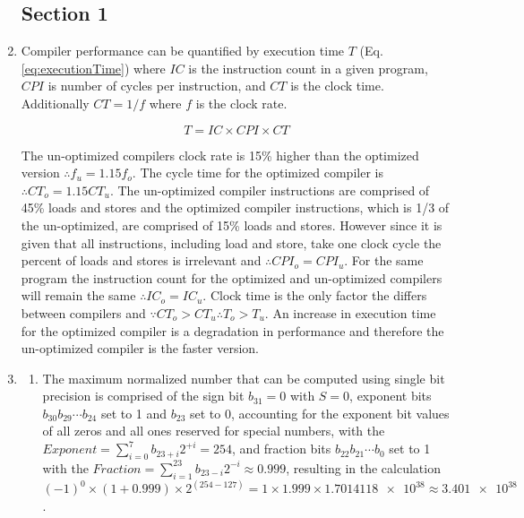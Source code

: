 \documentclass[main.tex]{subfiles}
\begin{document}
\begin{enumerate}

\subsection{Section 1}

\item Compiler performance can be quantified by execution time $T$ (Eq. \ref{eq:executionTime}) where $IC$ is the instruction count in a given program, $CPI$ is number of cycles per instruction, and $CT$ is the clock time. Additionally $CT=1/f$ where $f$ is the clock rate.

\begin{equation} \label{eq:executionTime}
T = IC \times CPI \times CT
\end{equation}

The un-optimized compilers clock rate is 15\% higher than the optimized version $\therefore f_{u} = 1.15f_{o}$. The cycle time for the optimized compiler is $\therefore CT_o = 1.15CT_u$. The un-optimized compiler instructions are comprised of 45\% loads and stores and the optimized compiler instructions, which is 1/3 of the un-optimized, are comprised of 15\% loads and stores. However since it is given that all instructions, including load and store, take one clock cycle the percent of loads and stores is irrelevant and $\therefore CPI_o = CPI_u$. For the same program the instruction count for the optimized and un-optimized compilers will remain the same $\therefore IC_o = IC_u$. Clock time is the only factor the differs between compilers and $\because CT_o > CT_u \therefore T_o > T_u$. An increase in execution time for the optimized compiler is a degradation in performance and therefore the un-optimized compiler is the faster version.


\item 
\begin{enumerate}
    \item The maximum normalized number that can be computed using single bit precision is comprised of the sign bit $b_{31} = 0$ with $S=0$, exponent bits $b_{30} b_{29} \cdots b_{24}$ set to 1 and $b_{23}$ set to 0, accounting for the exponent bit values of all zeros and all ones reserved for special numbers, with the $Exponent = \sum_{i=0}^{7} b_{23+i} 2^{+i} = 254$, and fraction bits $b_{22} b_{21} \cdots b_{0}$ set to 1 with the $Fraction = \sum_{i=1}^{23} b_{23-i} 2^{-i} \approx 0.999$, resulting in the calculation $(-1)^0 \times (1+0.999) \times 2^{(254-127)} = 1 \times 1.999 \times \num{1.7014118e38} \approx \num{3.401e38}$. 
    

\end{enumerate}
\end{enumerate}
\end{document}
